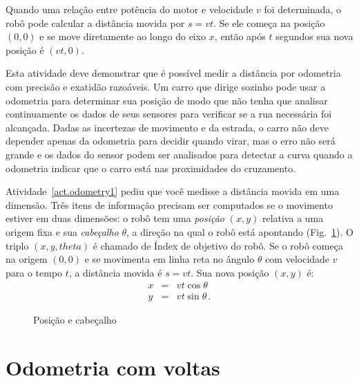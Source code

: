 {Quando uma relação entre potência do motor e velocidade $v$ foi determinada, o robô pode calcular a distância movida por $s=vt$. Se ele começa na posição $(0,0)$ e se move diretamente ao longo do eixo $x$, então após $t$ segundos sua nova posição é $(vt,0)$.

Esta atividade deve demonstrar que é possível medir a distância por odometria com precisão e exatidão razoáveis. Um carro que dirige sozinho pode usar a odometria para determinar sua posição de modo que não tenha que analisar continuamente os dados de seus sensores para verificar se a rua necessária foi alcançada. Dadas as incertezas de movimento e da estrada, o carro não deve depender apenas da odometria para decidir quando virar, mas o erro não será grande e os dados do sensor podem ser analisados para detectar a curva quando a odometria indicar que o carro está nas proximidades do cruzamento.

Atividade~\ref{act.odometry1} pediu que você medisse a distância movida em uma dimensão. Três itens de informação precisam ser computados se o movimento estiver em duas dimensões: o robô tem uma \emph{posição} $(x,y)$ relativa a uma origem fixa e sua \emph{cabeçalho} $\theta$, a direção na qual o robô está apontando (Fig.~\ref{fig.pos-head}). O triplo $(x,y,theta)$ é chamado de Índex de objetivo do robô. Se o robô começa na origem $(0,0)$ e se movimenta em linha reta no ângulo $\theta$ com velocidade $v$ para o tempo $t$, a distância movida é $s=vt$. Sua nova posição $(x,y)$ é:
\begin{eqnarray*}
x &=& vt \cos \theta\\
y &=& vt \sin \theta\,.
\end{eqnarray*}

\begin{figure}
\begin{center}
\caption{Posição e cabeçalho}\label{fig.pos-head}
\end{center}
\end{figure}

\section{Odometria com voltas}\label{s.odometry-turns}

}

